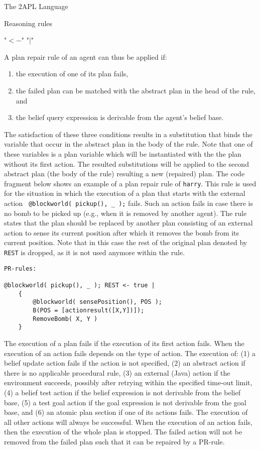 \begin{chapter}{The 2APL Language}
\begin{section}{Reasoning rules}
\begin{subsection}
         "$<-$"  "$|$" 

A plan repair rule of an agent can thus be applied if:
\begin{enumerate}
    \item the execution of one of its plan fails,
    \item the failed plan can be matched with the abstract plan in the head of the rule, and
    \item the belief query expression is derivable from the agent's belief base.
\end{enumerate}

The satisfaction of these three conditions results in a substitution
that binds the variable that occur in the abstract plan in the body
of the rule. Note that one of these variables is a plan variable
which will be instantiated with the the plan without its first
action. The resulted substitutions will be applied to the second
abstract plan (the body of the rule) resulting a new (repaired)
plan. The code fragment below shows an example of a plan repair rule
of {\tt harry}. This rule is used for the situation in which the
execution of a plan that starts with the external action {\tt
@blockworld( pickup(), \_ );} fails. Such an action fails in case
there is no bomb to be picked up (e.g., when it is removed by
another agent). The rule states that the plan should be replaced by
another plan consisting of an external action to sense its current
position after which it removes the bomb from its current position.
Note that in this case the rest of the original plan denoted by {\tt
REST} is dropped, as it is not used anymore within the rule.

\begin{verbatim}
PR-rules:

@blockworld( pickup(), _ ); REST <- true |
    {
        @blockworld( sensePosition(), POS );
        B(POS = [actionresult([X,Y])]);
        RemoveBomb( X, Y )
    }
\end{verbatim}

The execution of a plan fails if the execution of its first action
fails.  When the execution of an action fails depends on the type of
action. The execution of: (1) a belief update action fails if the
action is not specified, (2) an abstract action if there is no
applicable procedural rule, (3) an external (Java) action if the
environment succeeds, possibly after retrying within the specified
time-out limit, (4) a belief test action if the belief expression is
not derivable from the belief base, (5) a test goal action if the
goal expression is not derivable from the goal base, and (6) an
atomic plan section if one of its actions fails. The execution of
all other actions will always be successful. When the execution of
an action fails, then the execution of the whole plan is stopped.
The failed action will not be removed from the failed plan such that
it can be repaired by a PR-rule.


\end{subsection}
\end{section}
\end{chapter}

